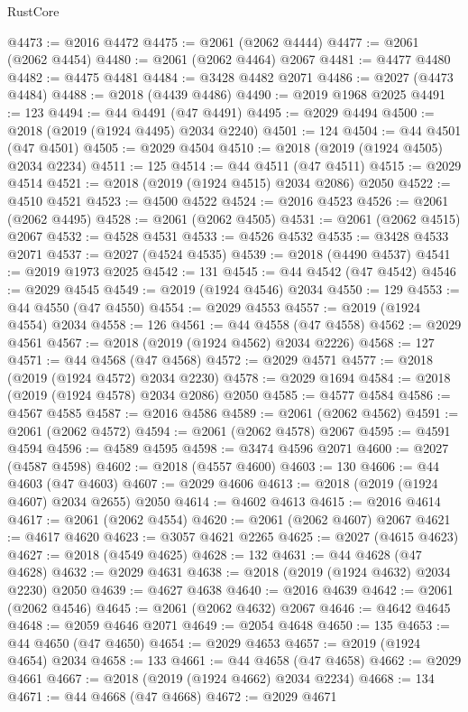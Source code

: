 \begin{lexlean}{RustCore}
\begin{coremodule}
@4473 := @2016 @4472
@4475 := @2061 (@2062 @4444)
@4477 := @2061 (@2062 @4454)
@4480 := @2061 (@2062 @4464) @2067
@4481 := @4477 @4480
@4482 := @4475 @4481
@4484 := @3428 @4482 @2071
@4486 := @2027 (@4473 @4484)
@4488 := @2018 (@4439 @4486)
@4490 := @2019 @1968 @2025
@4491 := 123
@4494 := @44 @4491 (@47 @4491)
@4495 := @2029 @4494
@4500 := @2018 (@2019 (@1924 @4495) @2034 @2240)
@4501 := 124
@4504 := @44 @4501 (@47 @4501)
@4505 := @2029 @4504
@4510 := @2018 (@2019 (@1924 @4505) @2034 @2234)
@4511 := 125
@4514 := @44 @4511 (@47 @4511)
@4515 := @2029 @4514
@4521 := @2018 (@2019 (@1924 @4515) @2034 @2086) @2050
@4522 := @4510 @4521
@4523 := @4500 @4522
@4524 := @2016 @4523
@4526 := @2061 (@2062 @4495)
@4528 := @2061 (@2062 @4505)
@4531 := @2061 (@2062 @4515) @2067
@4532 := @4528 @4531
@4533 := @4526 @4532
@4535 := @3428 @4533 @2071
@4537 := @2027 (@4524 @4535)
@4539 := @2018 (@4490 @4537)
@4541 := @2019 @1973 @2025
@4542 := 131
@4545 := @44 @4542 (@47 @4542)
@4546 := @2029 @4545
@4549 := @2019 (@1924 @4546) @2034
@4550 := 129
@4553 := @44 @4550 (@47 @4550)
@4554 := @2029 @4553
@4557 := @2019 (@1924 @4554) @2034
@4558 := 126
@4561 := @44 @4558 (@47 @4558)
@4562 := @2029 @4561
@4567 := @2018 (@2019 (@1924 @4562) @2034 @2226)
@4568 := 127
@4571 := @44 @4568 (@47 @4568)
@4572 := @2029 @4571
@4577 := @2018 (@2019 (@1924 @4572) @2034 @2230)
@4578 := @2029 @1694
@4584 := @2018 (@2019 (@1924 @4578) @2034 @2086) @2050
@4585 := @4577 @4584
@4586 := @4567 @4585
@4587 := @2016 @4586
@4589 := @2061 (@2062 @4562)
@4591 := @2061 (@2062 @4572)
@4594 := @2061 (@2062 @4578) @2067
@4595 := @4591 @4594
@4596 := @4589 @4595
@4598 := @3474 @4596 @2071
@4600 := @2027 (@4587 @4598)
@4602 := @2018 (@4557 @4600)
@4603 := 130
@4606 := @44 @4603 (@47 @4603)
@4607 := @2029 @4606
@4613 := @2018 (@2019 (@1924 @4607) @2034 @2655) @2050
@4614 := @4602 @4613
@4615 := @2016 @4614
@4617 := @2061 (@2062 @4554)
@4620 := @2061 (@2062 @4607) @2067
@4621 := @4617 @4620
@4623 := @3057 @4621 @2265
@4625 := @2027 (@4615 @4623)
@4627 := @2018 (@4549 @4625)
@4628 := 132
@4631 := @44 @4628 (@47 @4628)
@4632 := @2029 @4631
@4638 := @2018 (@2019 (@1924 @4632) @2034 @2230) @2050
@4639 := @4627 @4638
@4640 := @2016 @4639
@4642 := @2061 (@2062 @4546)
@4645 := @2061 (@2062 @4632) @2067
@4646 := @4642 @4645
@4648 := @2059 @4646 @2071
@4649 := @2054 @4648
@4650 := 135
@4653 := @44 @4650 (@47 @4650)
@4654 := @2029 @4653
@4657 := @2019 (@1924 @4654) @2034
@4658 := 133
@4661 := @44 @4658 (@47 @4658)
@4662 := @2029 @4661
@4667 := @2018 (@2019 (@1924 @4662) @2034 @2234)
@4668 := 134
@4671 := @44 @4668 (@47 @4668)
@4672 := @2029 @4671

\end{coremodule}
\end{lexlean}
